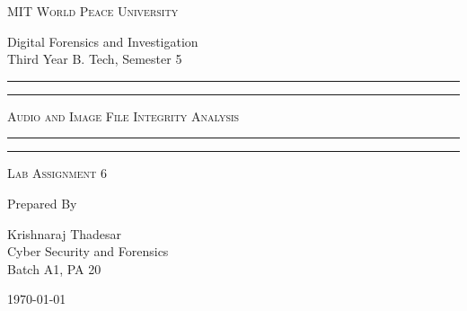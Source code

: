 \documentclass[11pt]{article}
\begin{document}
\begin{titlepage}
    \centering


    \huge\textsc{
        MIT World Peace University
    }\\

    \vspace{0.75\baselineskip} %

    \LARGE{
        Digital Forensics and Investigation\\
        Third Year B. Tech, Semester 5
    }

    \vfill %


    \rule{\textwidth}{1.6pt}\vspace*{-\baselineskip}\vspace*{2pt}
    \rule{\textwidth}{0.6pt}
    \vspace{0.75\baselineskip} %



    \huge{\textsc{
            Audio and Image File Integrity Analysis
        }} \\



    \vspace{0.5\baselineskip} %
    \rule{\textwidth}{0.6pt}\vspace*{-\baselineskip}\vspace*{2.8pt}
    \rule{\textwidth}{1.6pt}

    \vspace{1\baselineskip} %


    \LARGE\textsc{
        Lab Assignment 6
    } %
    \vfill


    Prepared By
    \vspace{0.5\baselineskip} %

    \Large{
        Krishnaraj Thadesar \\
        Cyber Security and Forensics\\
        Batch A1, PA 20
    }


    \vspace{0.5\baselineskip} %
    \today

\end{titlepage}
\end{document}
